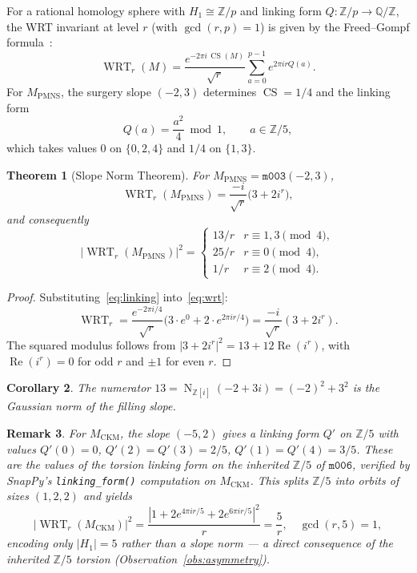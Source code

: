 \documentclass[11pt,a4paper]{article}
\newtheorem{theorem}{Theorem}[section]
\newtheorem{corollary}[theorem]{Corollary}
\newtheorem{remark}[theorem]{Remark}
\theoremstyle{definition}
\newcommand{\Z}{\mathbb{Z}}
\newcommand{\Q}{\mathbb{Q}}
\newcommand{\mfld}[1]{\texttt{#1}}
\newcommand{\WRT}{\operatorname{WRT}}
\newcommand{\CS}{\operatorname{CS}}
\newcommand{\N}{\operatorname{N}}
\begin{document}
For a rational homology sphere with $H_1\cong\Z/p$ and linking form
$Q:\Z/p\to\Q/\Z$, the WRT invariant at level $r$ (with $\gcd(r,p)=1$)
is given by the Freed--Gompf formula~\cite{FreedGompf}:
\begin{equation}
\WRT_r(M) = \frac{e^{-2\pi i\,\CS(M)}}{\sqrt{r}}
\sum_{a=0}^{p-1} e^{2\pi i r Q(a)}.
\label{eq:wrt}
\end{equation}
For $M_{\mathrm{PMNS}}$, the surgery slope $(-2,3)$ determines
$\CS=1/4$ and the linking form
\begin{equation}
Q(a) = \frac{a^2}{4}\bmod1,\qquad a\in\Z/5,
\label{eq:linking}
\end{equation}
which takes values $0$ on $\{0,2,4\}$ and $1/4$ on $\{1,3\}$.

\begin{theorem}[Slope Norm Theorem]\label{thm:slope}
For $M_{\mathrm{PMNS}}=\mfld{m003}(-2,3)$,
\begin{equation}
\WRT_r(M_{\mathrm{PMNS}}) = \frac{-i}{\sqrt{r}}\bigl(3+2i^r\bigr),
\end{equation}
and consequently
\begin{equation}
|\WRT_r(M_{\mathrm{PMNS}})|^2 =
\begin{cases}
13/r & r\equiv1,3\pmod4,\\[2pt]
25/r & r\equiv0\pmod4,\\[2pt]
1/r  & r\equiv2\pmod4.
\end{cases}
\end{equation}
\end{theorem}

\begin{proof}
Substituting~\eqref{eq:linking} into~\eqref{eq:wrt}:
\[
\WRT_r = \frac{e^{-2\pi i/4}}{\sqrt{r}}
\bigl(3\cdot e^{0}+2\cdot e^{2\pi ir/4}\bigr)
= \frac{-i}{\sqrt{r}}(3+2i^r).
\]
The squared modulus follows from $|3+2i^r|^2=13+12\operatorname{Re}(i^r)$,
with $\operatorname{Re}(i^r)=0$ for odd $r$ and $\pm1$ for even $r$.
\end{proof}

\begin{corollary}
The numerator $13=\N_{\Z[i]}(-2+3i)=(-2)^2+3^2$ is the Gaussian norm
of the filling slope.
\end{corollary}

\begin{remark}
For $M_{\mathrm{CKM}}$, the slope $(-5,2)$ gives a linking form
$Q'$ on $\Z/5$ with values $Q'(0)=0$, $Q'(2)=Q'(3)=2/5$,
$Q'(1)=Q'(4)=3/5$.
These are the values of the torsion linking form on the inherited
$\Z/5$ of $\mfld{m006}$, verified by SnapPy's
\texttt{linking\_form()} computation on $M_{\mathrm{CKM}}$.
This splits $\Z/5$ into orbits of sizes $(1,2,2)$ and yields
\[
|\WRT_r(M_{\mathrm{CKM}})|^2
= \frac{|1+2e^{4\pi ir/5}+2e^{6\pi ir/5}|^2}{r}
= \frac{5}{r},\quad \gcd(r,5)=1,
\]
encoding only $|H_1|=5$ rather than a slope norm --- a direct
consequence of the inherited $\Z/5$ torsion
(Observation~\ref{obs:asymmetry}).
\end{remark}
\end{document}
